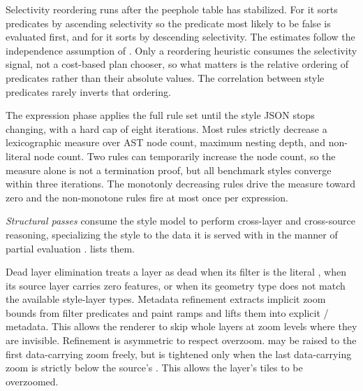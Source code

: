 Selectivity reordering runs after the peephole table has stabilized.
For  it sorts predicates by ascending selectivity so the predicate most likely to be false is evaluated first, and for  it sorts by descending selectivity.
The estimates follow the independence assumption of \citet{selingerAccessPathSelection1979}.
Only a reordering heuristic consumes the selectivity signal, not a cost-based plan chooser, so what matters is the relative ordering of predicates rather than their absolute values.
The correlation between style predicates rarely inverts that ordering.

The expression phase applies the full rule set until the style JSON stops changing, with a hard cap of eight iterations.
Most rules strictly decrease a lexicographic measure over \ac{AST} node count, maximum nesting depth, and non-literal node count.
Two rules can temporarily increase the node count, so the measure alone is not a termination proof, but all benchmark styles converge within three iterations.
The monotonly decreasing rules drive the measure toward zero and the non-monotone rules fire at most once per expression.

\textit{Structural passes} consume the style model to perform cross-layer and cross-source reasoning, specializing the style to the data it is served with in the manner of partial evaluation \citep{jonesPartialEvaluationAutomatic1993}.
 lists them.

Dead layer elimination treats a layer as dead when its filter is the literal , when its source layer carries zero features, or when its geometry type does not match the available style-layer types.
Metadata refinement extracts implicit zoom bounds from filter predicates and paint ramps and lifts them into explicit / metadata.
This allows the renderer to skip whole layers at zoom levels where they are invisible.
Refinement is asymmetric to respect overzoom.
 may be raised to the first data-carrying zoom freely, but  is tightened only when the last data-carrying zoom is strictly below the source's .
This allows the layer's tiles to be overzoomed.


